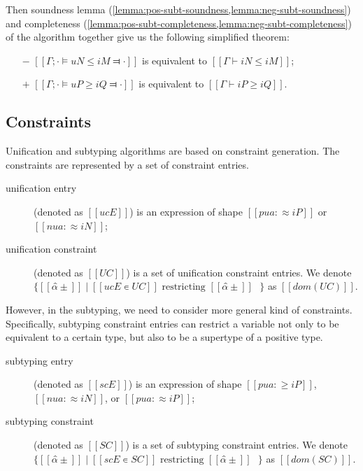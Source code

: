 \documentclass[acmsmall,natbib=false,review,anonymous]{acmart}
\begin{document}
Then soundness lemma (\cref{lemma:pos-subt-soundness,lemma:neg-subt-soundness}) 
and completeness (\cref{lemma:pos-subt-completeness,lemma:neg-subt-completeness})
of the algorithm together give us the following simplified theorem:

\begin{theorempreview}
  \hfill
  \begin{itemize}
    \item [$-$]  $[[ Γ ; · ⊨ uN ≤ iM ⫤ · ]]$ is equivalent to $[[ Γ ⊢ iN ≤ iM ]]$;
    \item [$+$] $[[ Γ ; · ⊨ uP ≥ iQ ⫤ · ]]$ is equivalent to $[[ Γ ⊢ iP ≥ iQ ]]$.
  \end{itemize}
\end{theorempreview}


\subsection{Constraints}

Unification and subtyping algorithms are based on constraint generation.
The constraints are represented by a set of constraint entries.

\begin{definition}
  \hfill
  \begin{description}
    \item[unification entry] (denoted as $[[ucE]]$) is an expression of shape 
      $[[pua :≈ iP]]$ or $[[nua :≈ iN]]$;
    \item[unification constraint] (denoted as $[[UC]]$) is a set of 
      unification constraint entries.
      We denote $\{[[α̂±]] \mid [[ucE ∊ UC]] \text{ restricting $[[α̂±]]$ }\}$ 
      as $[[dom(UC)]]$.
  \end{description}
\end{definition}

However, in the subtyping, we need to consider more general
kind of constraints. Specifically,
subtyping constraint entries can restrict a variable
not only to be equivalent to a certain type, but
also to be a supertype of a positive type.

\begin{definition}
  \hfill
  \begin{description}
    \item[subtyping entry] (denoted as $[[scE]]$) is an expression of shape 
      $[[pua :≥ iP]]$, $[[nua :≈ iN]]$, or $[[pua :≈ iP]]$;
    \item[subtyping constraint] (denoted as $[[SC]]$) is a set of subtyping constraint entries.
      We denote $\{[[α̂±]] \mid [[scE ∊ SC]] \text{ restricting $[[α̂±]]$ }\}$ 
      as $[[dom(SC)]]$.
  \end{description}
\end{definition}
\end{document}
